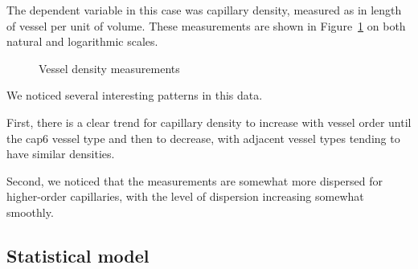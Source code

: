 \documentclass[
  letterpaper,
  DIV=11,
  numbers=noendperiod,
  oneside]{scrartcl}
\theoremstyle{plain}
\theoremstyle{remark}
\begin{document}
The dependent variable in this case was capillary density, measured as
in length of vessel per unit of volume. These measurements are shown in
Figure~\ref{fig-density-measurements} on both natural and logarithmic
scales.

\begin{figure}


\caption{\label{fig-density-measurements}Vessel density measurements}

\end{figure}%

We noticed several interesting patterns in this data.

First, there is a clear trend for capillary density to increase with
vessel order until the cap6 vessel type and then to decrease, with
adjacent vessel types tending to have similar densities.

Second, we noticed that the measurements are somewhat more dispersed for
higher-order capillaries, with the level of dispersion increasing
somewhat smoothly.

\subsection{Statistical model}\label{sec-density-model}
\end{document}
